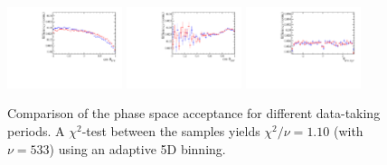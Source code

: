 \begin{figure}[h]
\includegraphics[height=!,width=0.3\textwidth]{figs/AcceptancePhsp/eff_cosTheta_Kpi_run.pdf}
\includegraphics[height=!,width=0.3\textwidth]{figs/AcceptancePhsp/eff_cosTheta_Dspi_run.pdf}
\includegraphics[height=!,width=0.3\textwidth]{figs/AcceptancePhsp/eff_phi_Kpi_Dspi_run.pdf}

\caption{Comparison of the phase space acceptance for different data-taking periods. 
A $\chi^2$-test between the samples yields $\chi^2/\nu = 1.10$ (with $\nu = 533$) using an adaptive 5D binning.
}
\label{fig:PhspEffRun}
\end{figure}


